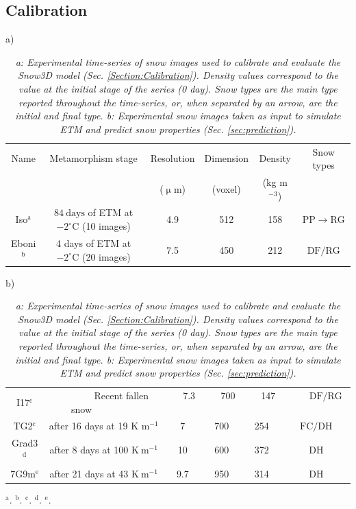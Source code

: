 \documentclass[draft,ms]{agujournal2019}
\begin{document}
\subsection{Calibration} 
\label{subsec:calib}

\begin{table}
\caption{\textit{a: Experimental time-series of snow images used to calibrate and evaluate the Snow3D model (Sec. \ref{Section:Calibration}). Density values correspond to the value at the initial stage of the series (0 day). Snow types are the main type reported throughout the time-series, or, when separated by an arrow, are the initial and final type. b: Experimental snow images taken as input to simulate ETM and predict snow properties (Sec. \ref{sec:prediction}).}}
a)\\
\begin{tabular}{|c|c|c|c|c|c|}
\hline Name & Metamorphism stage & Resolution & Dimension & Density & Snow types \\
 &  & ($\upmu$m) &(voxel) & (kg m$^{-3}$) &  \\
\hline 
Iso$^\mathrm{a}$ & $84\ \mathrm{days}$ of ETM at $-2^{\circ} \mathrm{C}$ (10 images) & 4.9 & 512 & 158 & \small{$\mathrm{PP} \rightarrow \mathrm{RG}$}\\
Eboni$^\mathrm{b}$ & 4 days of ETM at $-2^{\circ} \mathrm{C}$ (20 images) & 7.5 & 450 & 212 & \small{$\mathrm{DF/RG}$}\\
\hline 
\end{tabular}
b)\\
\begin{tabular}{|c|c|c|c|c|c|}
\hline 
I17$^\mathrm{c}$ &$\quad$ $\qquad$  Recent fallen snow $\qquad$ $\qquad$ &$\quad$ 7.3 $\quad$&$\quad$ 700 $\quad$&$\quad$ 147 $\quad$& $\qquad$\small{$\mathrm{DF/RG}$} $\qquad$\\
TG2$^\mathrm{c}$ & after 16 days at 19 K m$^{-1}$ & 7 & 700 & 254 & \small{$\mathrm{FC} / \mathrm{DH}$} \\
Grad3$^\mathrm{d}$ & after 8 days at 100 $\mathrm{K}\ \mathrm{m}^{-1}$ & 10 & 600 & 372 & \small{$\mathrm{DH}$} \\
7G9m$^\mathrm{e}$ & after 21 days at 43 $\mathrm{K}\ \mathrm{m}^{-1}$ & 9.7 & 950 & 314 & \small{$\mathrm{DH}$} \\
\hline
\end{tabular}
\label{tab:series}
$^\mathrm{a}$\protect{}. $^\mathrm{b}$\protect{}.
$^\mathrm{c}$\protect{}.  $^\mathrm{d}$\protect{}. $^\mathrm{e}$\protect{}.
\end{table}
\end{document}
